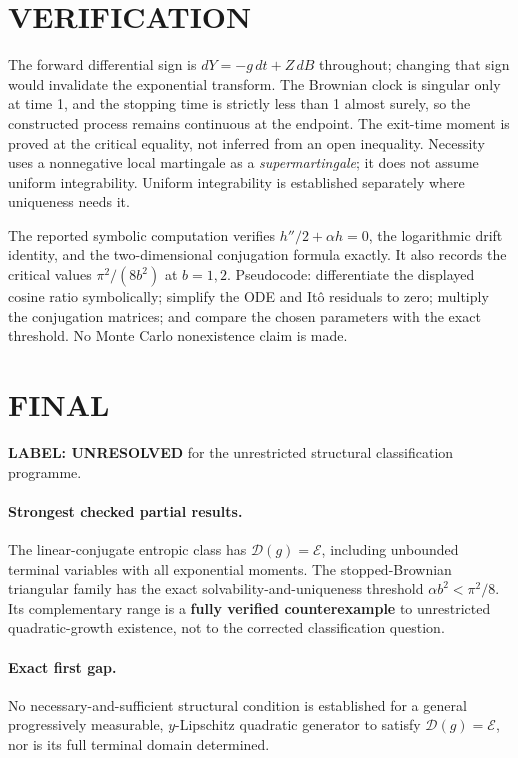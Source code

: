 \documentclass[11pt,a4paper]{article}
\theoremstyle{definition}
\theoremstyle{remark}
\begin{document}
\section{VERIFICATION}
The forward differential sign is $dY=-g\,dt+Z\,dB$ throughout; changing that sign would invalidate the exponential transform. The Brownian clock is singular only at time 1, and the stopping time is strictly less than 1 almost surely, so the constructed process remains continuous at the endpoint. The exit-time moment is proved at the critical equality, not inferred from an open inequality. Necessity uses a nonnegative local martingale as a \emph{supermartingale}; it does not assume uniform integrability. Uniform integrability is established separately where uniqueness needs it.

The reported symbolic computation verifies $h''/2+\alpha h=0$, the logarithmic drift identity, and the two-dimensional conjugation formula exactly. It also records the critical values $\pi^2/(8b^2)$ at $b=1,2$. Pseudocode: differentiate the displayed cosine ratio symbolically; simplify the ODE and It\^o residuals to zero; multiply the conjugation matrices; and compare the chosen parameters with the exact threshold. No Monte Carlo nonexistence claim is made.

\section{FINAL}
\textbf{LABEL: UNRESOLVED} for the unrestricted structural classification programme.

\paragraph{Strongest checked partial results.}
The linear-conjugate entropic class has $\mathcal D(g)=\mathcal E$, including unbounded terminal variables with all exponential moments. The stopped-Brownian triangular family has the exact solvability-and-uniqueness threshold $\alpha b^2<\pi^2/8$. Its complementary range is a \textbf{fully verified counterexample} to unrestricted quadratic-growth existence, not to the corrected classification question.

\paragraph{Exact first gap.}
No necessary-and-sufficient structural condition is established for a general progressively measurable, $y$-Lipschitz quadratic generator to satisfy $\mathcal D(g)=\mathcal E$, nor is its full terminal domain determined.
\end{document}

